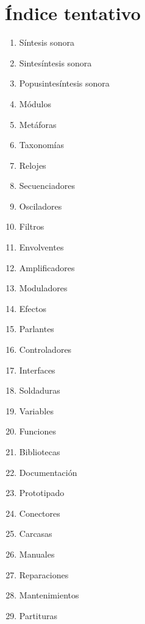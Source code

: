 \documentclass[../proyecto.tex]{subfiles}
\begin{document}
\chapter{Índice tentativo}


\begin{enumerate}
    \item Síntesis sonora
    \item Sintesíntesis sonora
    \item Popusintesíntesis sonora
    \item Módulos
    \item Metáforas
    \item Taxonomías
    \item Relojes
    \item Secuenciadores
    \item Osciladores
    \item Filtros
    \item Envolventes
    \item Amplificadores
    \item Moduladores
    \item Efectos
    \item Parlantes
    \item Controladores
    \item Interfaces
    \item Soldaduras
    \item Variables
    \item Funciones
    \item Bibliotecas
    \item Documentación
    \item Prototipado
    \item Conectores
    \item Carcasas
    \item Manuales
    \item Reparaciones
    \item Mantenimientos
    \item Partituras
\end{enumerate}
\end{document}
